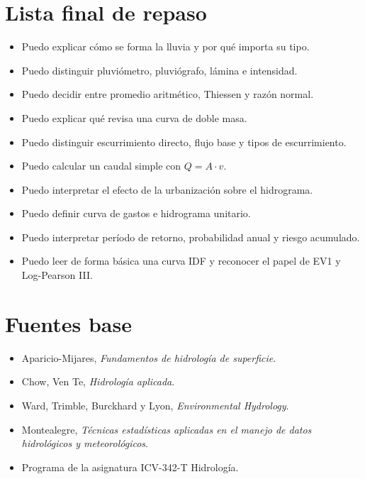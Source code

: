 \documentclass[11pt]{article}
\begin{document}
\section{Lista final de repaso}
\begin{itemize}
\item Puedo explicar cómo se forma la lluvia y por qué importa su tipo.
\item Puedo distinguir pluviómetro, pluviógrafo, lámina e intensidad.
\item Puedo decidir entre promedio aritmético, Thiessen y razón normal.
\item Puedo explicar qué revisa una curva de doble masa.
\item Puedo distinguir escurrimiento directo, flujo base y tipos de escurrimiento.
\item Puedo calcular un caudal simple con \(Q=A\cdot v\).
\item Puedo interpretar el efecto de la urbanización sobre el hidrograma.
\item Puedo definir curva de gastos e hidrograma unitario.
\item Puedo interpretar período de retorno, probabilidad anual y riesgo acumulado.
\item Puedo leer de forma básica una curva IDF y reconocer el papel de EV1 y Log-Pearson III.
\end{itemize}

\section{Fuentes base}
\begin{itemize}
\item Aparicio-Mijares, \emph{Fundamentos de hidrología de superficie}.
\item Chow, Ven Te, \emph{Hidrología aplicada}.
\item Ward, Trimble, Burckhard y Lyon, \emph{Environmental Hydrology}.
\item Montealegre, \emph{Técnicas estadísticas aplicadas en el manejo de datos hidrológicos y meteorológicos}.
\item Programa de la asignatura ICV-342-T Hidrología.
\end{itemize}
\end{document}
